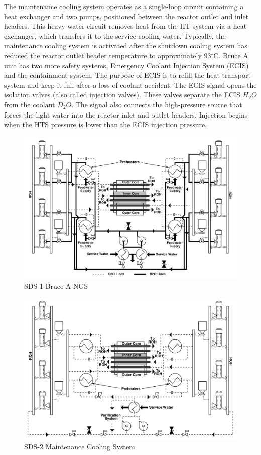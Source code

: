 \documentclass[12pt]{article}
\begin{document}
\begin{multicols}{2}
The maintenance cooling system operates as a single-loop circuit containing a heat exchanger and two pumps, positioned between the reactor outlet and inlet headers. This heavy water circuit removes heat from the HT system via a heat exchanger, which transfers it to the service cooling water. Typically, the maintenance cooling system is activated after the shutdown cooling system has reduced the reactor outlet header temperature to approximately 93$^{\circ}$C. Bruce A unit has two more safety systems, Emergency Coolant Injection System (ECIS) and the containment system. The purpose of ECIS is to refill the heat transport system and keep it full after a loss of coolant accident. The ECIS signal opens the isolation valves (also called injection valves). These valves separate the ECIS $H_2O$ from the coolant $D_2O$. The signal also connects the high-pressure source that forces the light water into the reactor inlet and outlet headers. Injection begins when the HTS pressure is lower than the ECIS injection pressure.

\end{multicols}

\begin{figure}
    \centering
    \includegraphics[width=0.5\linewidth]{figs/sds_1.png}
    \caption{SDS-1 Bruce A NGS}
    \label{fig:fig_7}
\end{figure}

\begin{figure}
    \centering
    \includegraphics[width=0.5\linewidth]{figs/sds_2.png}
    \caption{SDS-2 Maintenance Cooling System}
    \label{fig:fig_8}
\end{figure}
\end{document}
